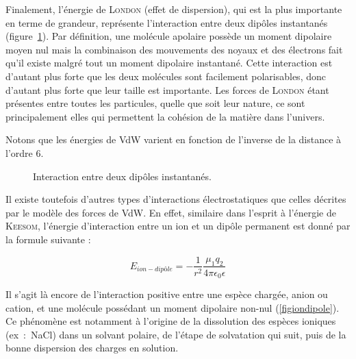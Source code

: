 {{Finalement, l'énergie de \textsc{London} (effet de dispersion), qui est la plus importante en terme de grandeur, représente l'interaction entre deux dipôles instantanés (figure~\ref{figLondon}). Par définition, une molécule apolaire possède un moment dipolaire moyen nul mais la combinaison des mouvements des noyaux et des électrons fait qu'il existe malgré tout un moment dipolaire instantané. Cette interaction est d'autant plus forte que les deux molécules sont facilement polarisables, donc d'autant plus forte que leur taille est importante. Les forces de \textsc{London} étant présentes entre toutes les particules, quelle que soit leur nature, ce sont principalement elles qui permettent la cohésion de la matière dans l'univers.

Notons que les énergies de VdW varient en fonction de l'inverse de la distance à l'ordre 6.

\begin{figure}[h]
\centering
{}
\caption{Interaction entre deux dipôles instantanés.}
\label{figLondon}
\end{figure}


Il existe toutefois d'autres types d'interactions électrostatiques que celles décrites par le modèle des forces de VdW. En effet, similaire dans l'esprit à l'énergie de \textsc{Keesom}, l'énergie d'interaction entre un ion et un dipôle permanent est donné par la formule suivante :

\begin{equation}
E_{ion-dipôle} = - \frac{1}{r^{2}} \frac{\mu_{1}q_{2}}{4\pi \epsilon_{0} \epsilon}
\end{equation} 

Il s'agit là encore de l'interaction positive entre une espèce chargée, anion ou cation, et une molécule possédant un moment dipolaire non-nul (\ref*{figiondipole}). Ce phénomène est notamment à l'origine de la dissolution des espèces ioniques (ex~:~NaCl) dans un solvant polaire, de l'étape de solvatation qui suit, puis de la bonne dispersion des charges en solution.

}}
